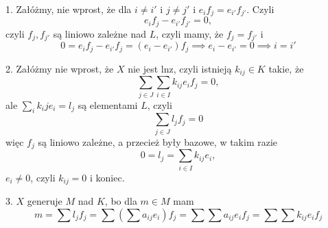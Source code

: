 1. Załóżmy, nie wprost, że dla $i\neq i'$ i $j\neq j'$ i $e_if_j=e_{i'}f_{j'}$. Czyli
$$e_if_j-e_{i'}f_{j'}=0,$$
czyli $f_j,f_{j'}$ są liniowo zależne nad $L$, czyli mamy, że $f_j=f_{j'}$ i
$$0=e_if_j-e_{i'}f_{j}=(e_i-e_{i'})f_j\implies e_i-e_{i'}=0\implies i=i'$$

2. Załóżmy nie wprost, że $X$ nie jest lnz, czyli istnieją $k_{ij}\in K$ takie, że
$$\sum\limits_{j\in J}\sum\limits_{i\in I}k_{ij}e_if_j=0,$$
ale $\sum\limits_ik_ije_i=l_j$ są elementami $L$, czyli
$$\sum\limits_{j\in J}l_jf_j=0$$
więc $f_j$ są liniowo zależne, a przecież były bazowe, w takim razie
$$0=l_j=\sum\limits_{i\in I}k_{ij}e_i,$$
$e_i\neq0$, czyli $k_{ij}=0$ i koniec.

3. $X$ generuje $M$ nad $K$, bo dla $m\in M$ mam
$$m=\sum l_jf_j=\sum\left(\sum a_{ij}e_i\right)f_j=\sum\sum a_{ij}e_if_j=\sum \sum k_{ij}e_if_j$$